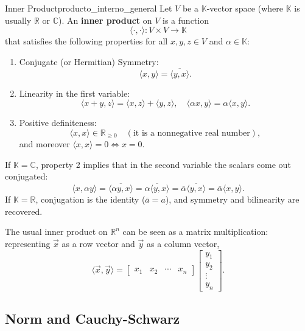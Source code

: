 \documentclass[11pt, a4paper]{article}
\begin{document}
\begin{definicion}{Inner Product}{producto_interno_general}
Let $V$ be a $\mathbb{K}$-vector space (where $\mathbb{K}$ is usually $\mathbb{R}$ or $\mathbb{C}$). An \textbf{inner product} on $V$ is a function
\[
\langle \cdot , \cdot \rangle : V \times V \to \mathbb{K}
\]
that satisfies the following properties for all $x, y, z \in V$ and $\alpha \in \mathbb{K}$:

\begin{enumerate}
    \item Conjugate (or Hermitian) Symmetry:
    \[
    \langle x, y \rangle = \overline{\langle y, x \rangle}.
    \]
    \item Linearity in the first variable:
    \[
    \langle x + y, z \rangle = \langle x, z \rangle + \langle y, z \rangle,
    \quad
    \langle \alpha x, y \rangle = \alpha \langle x, y \rangle.
    \]
    \item Positive definiteness:
    \[
    \langle x, x \rangle \in \mathbb{R}_{\geq 0} \quad (\text{it is a nonnegative real number}),
    \]
    and moreover $\langle x, x \rangle = 0 \iff x = 0$.
\end{enumerate}
\end{definicion}

\obs If $\mathbb{K} = \mathbb{C}$, property 2 implies that in the second variable the scalars come out conjugated:
\[
\langle x, \alpha y \rangle = \overline{\langle \alpha y, x \rangle} = \overline{\alpha \langle y, x \rangle} = \overline{\alpha} \overline{\langle y, x \rangle} = \overline{\alpha} \langle x, y \rangle.
\]
If $\mathbb{K} = \mathbb{R}$, conjugation is the identity ($\bar{a} = a$), and symmetry and bilinearity are recovered.

\obs The usual inner product on $\mathbb{R}^n$ can be seen as a matrix multiplication: representing $\vec{x}$ as a row vector and $\vec{y}$ as a column vector,
\[
\langle \vec{x}, \vec{y} \rangle = 
\begin{bmatrix} x_1 & x_2 & \cdots & x_n \end{bmatrix}
\begin{bmatrix} y_1 \\ y_2 \\ \vdots \\ y_n \end{bmatrix}.
\]

\subsection{Norm and Cauchy-Schwarz}
\end{document}
